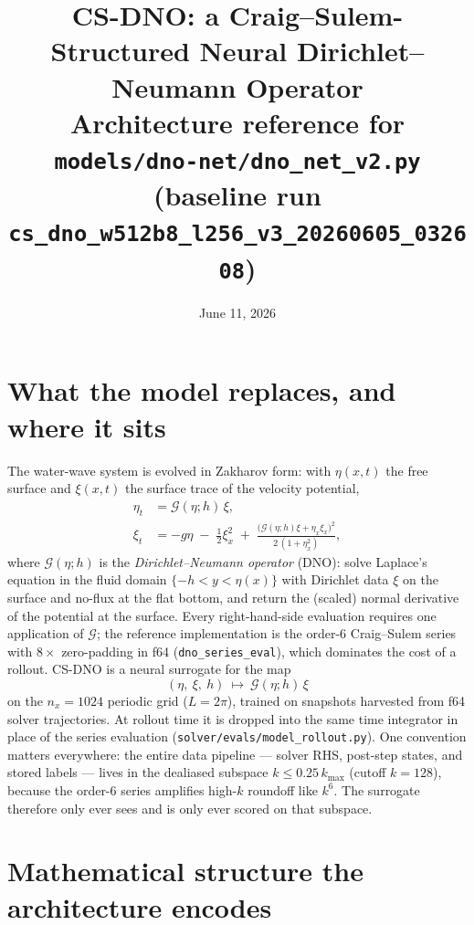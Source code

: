 \documentclass[11pt,letterpaper]{article}
\title{\textbf{CS-DNO: a Craig--Sulem-Structured Neural Dirichlet--Neumann Operator}\\[2pt]
       \large Architecture reference for \texttt{models/dno-net/dno\_net\_v2.py}
       (baseline run \texttt{cs\_dno\_w512b8\_l256\_v3\_20260605\_032608})}
\author{}
\date{June 11, 2026}
\newcommand{\Gop}{\mathcal{G}}
\begin{document}
\maketitle

\section{What the model replaces, and where it sits}

The water-wave system is evolved in Zakharov form: with $\eta(x,t)$ the free
surface and $\xi(x,t)$ the surface trace of the velocity potential,
\begin{align}
\eta_t &= \Gop(\eta;h)\,\xi, \\
\xi_t  &= -g\eta \;-\; \tfrac12 \xi_x^2
          \;+\; \frac{\bigl(\Gop(\eta;h)\xi + \eta_x \xi_x\bigr)^2}{2\,(1+\eta_x^2)},
\end{align}
where $\Gop(\eta;h)$ is the \emph{Dirichlet--Neumann operator} (DNO): solve
Laplace's equation in the fluid domain $\{-h < y < \eta(x)\}$ with Dirichlet
data $\xi$ on the surface and no-flux at the flat bottom, and return the
(scaled) normal derivative of the potential at the surface. Every right-hand-side
evaluation requires one application of $\Gop$; the reference implementation is
the order-6 Craig--Sulem series with $8\times$ zero-padding in f64
(\texttt{dno\_series\_eval}), which dominates the cost of a rollout. CS-DNO is a
neural surrogate for the map
\[
(\eta,\ \xi,\ h)\ \longmapsto\ \Gop(\eta;h)\,\xi
\]
on the $n_x=1024$ periodic grid ($L=2\pi$), trained on snapshots harvested from
f64 solver trajectories. At rollout time it is dropped into the same time
integrator in place of the series evaluation (\texttt{solver/evals/model\_rollout.py}).
One convention matters everywhere: the entire data pipeline --- solver RHS,
post-step states, and stored labels --- lives in the dealiased subspace
$k \le 0.25\,k_{\max}$ (cutoff $k=128$), because the order-6 series amplifies
high-$k$ roundoff like $k^6$. The surrogate therefore only ever sees and is only
ever scored on that subspace.

\section{Mathematical structure the architecture encodes}
\end{document}
